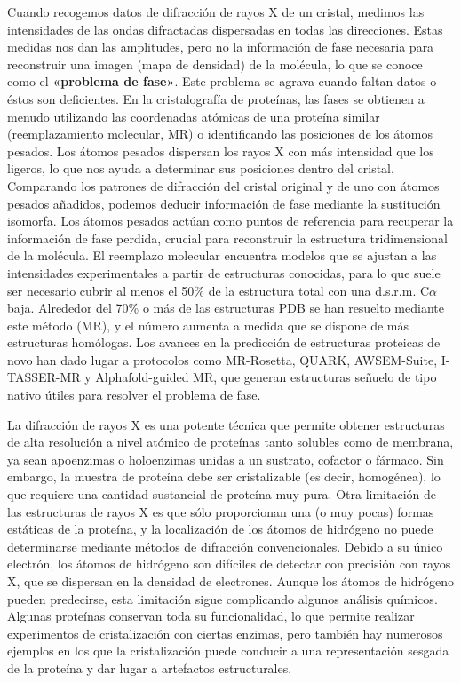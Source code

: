 Cuando recogemos datos de difracción de rayos X de un cristal, medimos las intensidades de las ondas difractadas dispersadas en todas las direcciones. Estas medidas nos dan las amplitudes, pero no la información de fase necesaria para reconstruir una imagen (mapa de densidad) de la molécula, lo que se conoce como el \textbf{«problema de fase»}. Este problema se agrava cuando faltan datos o éstos son deficientes. En la cristalografía de proteínas, las fases se obtienen a menudo utilizando las coordenadas atómicas de una proteína similar (reemplazamiento molecular, MR) o identificando las posiciones de los átomos pesados. Los átomos pesados dispersan los rayos X con más intensidad que los ligeros, lo que nos ayuda a determinar sus posiciones dentro del cristal. Comparando los patrones de difracción del cristal original y de uno con átomos pesados añadidos, podemos deducir información de fase mediante la sustitución isomorfa. Los átomos pesados actúan como puntos de referencia para recuperar la información de fase perdida, crucial para reconstruir la estructura tridimensional de la molécula. El reemplazo molecular encuentra modelos que se ajustan a las intensidades experimentales a partir de estructuras conocidas, para lo que suele ser necesario cubrir al menos el 50\% de la estructura total con una d.s.r.m. C$\alpha$ baja. Alrededor del 70\% o más de las estructuras PDB se han resuelto mediante este método (MR), y el número aumenta a medida que se dispone de más estructuras homólogas. Los avances en la predicción de estructuras proteicas de novo han dado lugar a protocolos como MR-Rosetta, QUARK, AWSEM-Suite, I-TASSER-MR y Alphafold-guided MR, que generan estructuras señuelo de tipo nativo útiles para resolver el problema de fase.

La difracción de rayos X es una potente técnica que permite obtener estructuras de alta resolución a nivel atómico de proteínas tanto solubles como de membrana, ya sean apoenzimas o holoenzimas unidas a un sustrato, cofactor o fármaco. Sin embargo, la muestra de proteína debe ser cristalizable (es decir, homogénea), lo que requiere una cantidad sustancial de proteína muy pura. Otra limitación de las estructuras de rayos X es que sólo proporcionan una (o muy pocas) formas estáticas de la proteína, y la localización de los átomos de hidrógeno no puede determinarse mediante métodos de difracción convencionales. Debido a su único electrón, los átomos de hidrógeno son difíciles de detectar con precisión con rayos X, que se dispersan en la densidad de electrones. Aunque los átomos de hidrógeno pueden predecirse, esta limitación sigue complicando algunos análisis químicos. Algunas proteínas conservan toda su funcionalidad, lo que permite realizar experimentos de cristalización con ciertas enzimas, pero también hay numerosos ejemplos en los que la cristalización puede conducir a una representación sesgada de la proteína y dar lugar a artefactos estructurales.

